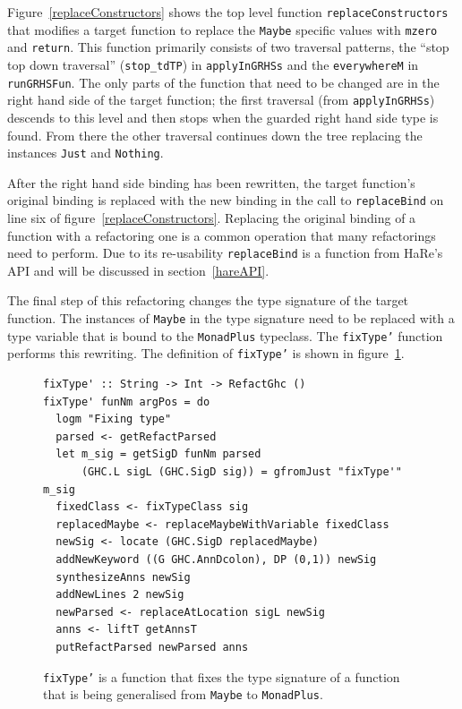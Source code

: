 Figure~\ref{replaceConstructors} shows the top level function \texttt{replaceConstructors} that modifies a target function to replace the \texttt{Maybe} specific values with \texttt{mzero} and \texttt{return}. This function primarily consists of two traversal patterns, the ``stop top down traversal'' (\texttt{stop\_tdTP}) in \texttt{applyInGRHSs} and the \texttt{everywhereM} in \texttt{runGRHSFun}. The only parts of the function that need to be changed are in the right hand side of the target function; the first traversal (from \texttt{applyInGRHSs}) descends to this level and then stops when the guarded right hand side type is found. From there the other traversal continues down the tree replacing the instances \texttt{Just} and \texttt{Nothing}.

After the right hand side binding has been rewritten, the target function's original binding is replaced with the new binding in the call to \texttt{replaceBind} on line six of figure~\ref{replaceConstructors}. Replacing the original binding of a function with a refactoring one is a common operation that many refactorings need to perform. Due to its re-usability \texttt{replaceBind} is a function from HaRe's API and will be discussed in section~\ref{hareAPI}. 

The final step of this refactoring changes the type signature of the target function. The instances of \texttt{Maybe} in the type signature need to be replaced with a type variable that is bound to the \texttt{MonadPlus} typeclass. The \texttt{fixType'} function performs this rewriting. The definition of \texttt{fixType'} is shown in figure~\ref{fixTypePrime}.

\begin{figure}[t]
\begin{lstlisting}
fixType' :: String -> Int -> RefactGhc ()
fixType' funNm argPos = do
  logm "Fixing type"
  parsed <- getRefactParsed
  let m_sig = getSigD funNm parsed
      (GHC.L sigL (GHC.SigD sig)) = gfromJust "fixType'" m_sig
  fixedClass <- fixTypeClass sig
  replacedMaybe <- replaceMaybeWithVariable fixedClass
  newSig <- locate (GHC.SigD replacedMaybe)
  addNewKeyword ((G GHC.AnnDcolon), DP (0,1)) newSig
  synthesizeAnns newSig
  addNewLines 2 newSig
  newParsed <- replaceAtLocation sigL newSig
  anns <- liftT getAnnsT
  putRefactParsed newParsed anns         
\end{lstlisting}
\caption{\texttt{fixType'} is a function that fixes the type signature of a function that is being generalised from \texttt{Maybe} to \texttt{MonadPlus}.}
\label{fixTypePrime}
\end{figure}

